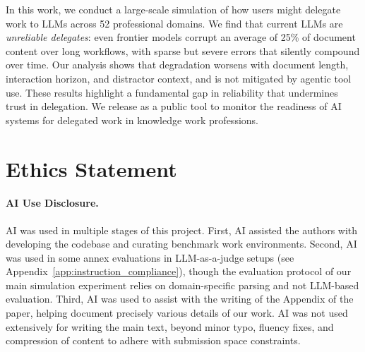 \documentclass{article} %
\begin{document}

In this work, we conduct a large-scale simulation of how users might delegate work to LLMs across 52 professional domains. We find that current LLMs are \textit{unreliable delegates}: even frontier models corrupt an average of 25\% of document content over long workflows, with sparse but severe errors that silently compound over time. Our analysis shows that degradation worsens with document length, interaction horizon, and distractor context, and is not mitigated by agentic tool use. These results highlight a fundamental gap in reliability that undermines trust in delegation. We release \benchmark{} as a public tool to monitor the readiness of AI systems for delegated work in knowledge work professions.

\section*{Ethics Statement} \label{sec:ethics}

\paragraph{AI Use Disclosure.} AI was used in multiple stages of this project. First, AI assisted the authors with developing the codebase and curating benchmark work environments. Second, AI was used in some annex evaluations in LLM-as-a-judge setups (see Appendix~\ref{app:instruction_compliance}), though the evaluation protocol of our main simulation experiment relies on domain-specific parsing and not LLM-based evaluation. Third, AI was used to assist with the writing of the Appendix of the paper, helping document precisely various details of our work. AI was not used extensively for writing the main text, beyond minor typo, fluency fixes, and compression of content to adhere with submission space constraints.
\end{document}
